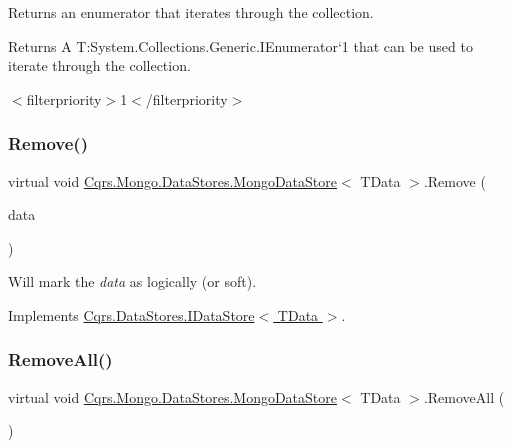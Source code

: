 Returns an enumerator that iterates through the collection. 

\begin{DoxyReturn}{Returns}
A T\+:\+System.\+Collections.\+Generic.\+I\+Enumerator`1 that can be used to iterate through the collection. 
\end{DoxyReturn}
$<$filterpriority$>$1$<$/filterpriority$>$ \mbox{\label{classCqrs_1_1Mongo_1_1DataStores_1_1MongoDataStore_a64003d01de3ac6ffd0e41bb7f572bf96}} 
\subsubsection{\texorpdfstring{Remove()}{Remove()}}
{\footnotesize\ttfamily virtual void \hyperlink{classCqrs_1_1Mongo_1_1DataStores_1_1MongoDataStore}{Cqrs.\+Mongo.\+Data\+Stores.\+Mongo\+Data\+Store}$<$ T\+Data $>$.Remove (\begin{DoxyParamCaption}\item[{T\+Data}]{data }\end{DoxyParamCaption})\hspace{0.3cm}{\ttfamily [virtual]}}



Will mark the {\itshape data}  as logically (or soft). 



Implements \hyperlink{interfaceCqrs_1_1DataStores_1_1IDataStore_a7ef540796bbe4257296841590bc23478}{Cqrs.\+Data\+Stores.\+I\+Data\+Store$<$ T\+Data $>$}.

\mbox{\label{classCqrs_1_1Mongo_1_1DataStores_1_1MongoDataStore_a878966ea796321cae54c3c619e3178d5}} 
\subsubsection{\texorpdfstring{Remove\+All()}{RemoveAll()}}
{\footnotesize\ttfamily virtual void \hyperlink{classCqrs_1_1Mongo_1_1DataStores_1_1MongoDataStore}{Cqrs.\+Mongo.\+Data\+Stores.\+Mongo\+Data\+Store}$<$ T\+Data $>$.Remove\+All (\begin{DoxyParamCaption}{ }\end{DoxyParamCaption})\hspace{0.3cm}{\ttfamily [virtual]}}



